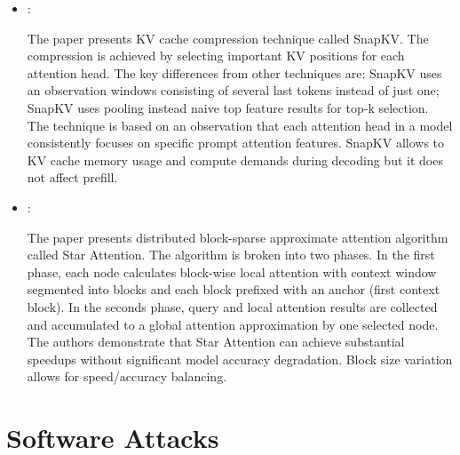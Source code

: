 \begin{itemize}
    \item \cite{Li:SnapKV:2024}:

    The paper presents KV cache compression technique called SnapKV. The compression is achieved by selecting important KV positions for each attention head. The key differences from other techniques are: SnapKV uses an observation windows consisting of several last tokens instead of just one; SnapKV uses pooling instead naive top feature results for top-k selection. The technique is based on an observation that each attention head in a model consistently focuses on specific prompt attention features. SnapKV allows to KV cache memory usage and compute demands during decoding but it does not affect prefill.

    \item \cite{Acharya:StarAttention:2025}:

    The paper presents distributed block-sparse approximate attention algorithm called Star Attention. The algorithm is broken into two phases. In the first phase, each node calculates block-wise local attention with context window segmented into blocks and each block prefixed with an anchor (first context block). In the seconds phase, query and local attention results are collected and accumulated to a global attention approximation by one selected node. The authors demonstrate that Star Attention can achieve substantial speedups without significant model accuracy degradation. Block size variation allows for speed/accuracy balancing.
\end{itemize}

\section*{Software Attacks}

